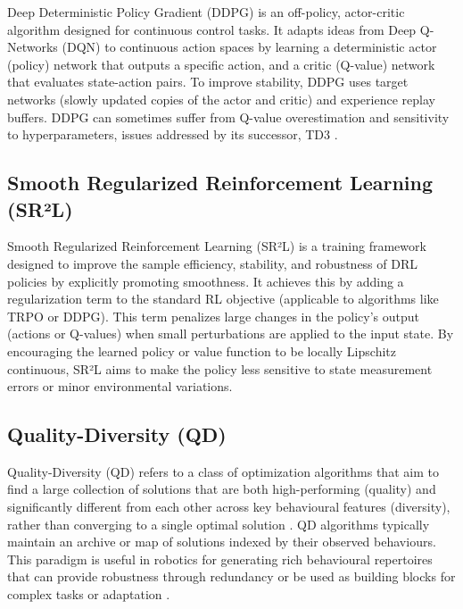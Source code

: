\documentclass[12pt, a4paper]{article} %
\begin{document}
Deep Deterministic Policy Gradient (DDPG) \citep{lillicrap2015continuous} is an off-policy, actor-critic algorithm designed for continuous control tasks. It adapts ideas from Deep Q-Networks (DQN) to continuous action spaces by learning a deterministic actor (policy) network that outputs a specific action, and a critic (Q-value) network that evaluates state-action pairs. To improve stability, DDPG uses target networks (slowly updated copies of the actor and critic) and experience replay buffers. DDPG can sometimes suffer from Q-value overestimation and sensitivity to hyperparameters, issues addressed by its successor, TD3 \citep{shen2020deep}.

\subsection{Smooth Regularized Reinforcement Learning (SR²L)}
\label{def:srl} %

Smooth Regularized Reinforcement Learning (SR²L) \citep{shen2020deep} is a training framework designed to improve the sample efficiency, stability, and robustness of DRL policies by explicitly promoting smoothness. It achieves this by adding a regularization term to the standard RL objective (applicable to algorithms like TRPO or DDPG). This term penalizes large changes in the policy's output (actions or Q-values) when small perturbations are applied to the input state. By encouraging the learned policy or value function to be locally Lipschitz continuous, SR²L aims to make the policy less sensitive to state measurement errors or minor environmental variations.

\subsection{Quality-Diversity (QD)}
\label{def:qd} %

Quality-Diversity (QD) refers to a class of optimization algorithms that aim to find a large collection of solutions that are both high-performing (quality) and significantly different from each other across key behavioural features (diversity), rather than converging to a single optimal solution \citep{pugh2016quality}. QD algorithms typically maintain an archive or map of solutions indexed by their observed behaviours. This paradigm is useful in robotics for generating rich behavioural repertoires that can provide robustness through redundancy or be used as building blocks for complex tasks or adaptation \citep[e.g.,][]{cully2015robots, allard2023online}.
\end{document}
